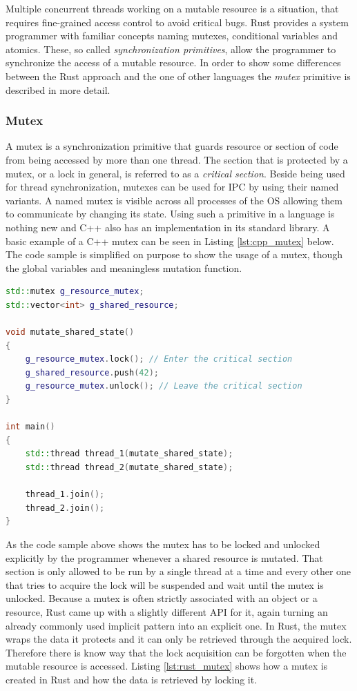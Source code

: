 Multiple concurrent threads working on a mutable resource is a situation, that requires fine-grained access control to avoid critical bugs. Rust provides a system programmer with familiar concepts naming mutexes, conditional variables and atomics. These, so called \textit{synchronization primitives}, allow the programmer to synchronize the access of a mutable resource. In order to show some differences between the Rust approach and the one of other languages the \textit{mutex} primitive is described in more detail.

\subsubsection{Mutex}

A mutex is a synchronization primitive that guards resource or section of code from being accessed by more than one thread. The section that is protected by a mutex, or a lock in general, is referred to as a \textit{critical section}. Beside being used for thread synchronization, mutexes can be used for \ac{IPC} by using their named variants. A named mutex is visible across all processes of the \ac{OS} allowing them to communicate by changing its state. Using such a primitive in a language is nothing new and C++ also has an implementation in its standard library. A basic example of a C++ mutex can be seen in Listing \ref{lst:cpp_mutex} below. The code sample is simplified on purpose to show the usage of a mutex, though the global variables and meaningless mutation function.\\

\begin{lstlisting}[caption={Usage of a std::mutex to guard a critical section in C++}, label={lst:cpp_mutex}, language=C++]
std::mutex g_resource_mutex;
std::vector<int> g_shared_resource;

void mutate_shared_state() 
{
	g_resource_mutex.lock(); // Enter the critical section
	g_shared_resource.push(42);
	g_resource_mutex.unlock(); // Leave the critical section
}

int main()
{
	std::thread thread_1(mutate_shared_state);
	std::thread thread_2(mutate_shared_state);
	
	thread_1.join();
	thread_2.join();
}
\end{lstlisting}

\noindent
As the code sample above shows the mutex has to be locked and unlocked explicitly by the programmer whenever a shared resource is mutated. That section is only allowed to be run by a single thread at a time and every other one that tries to acquire the lock will be suspended and wait until the mutex is unlocked. Because a mutex is often strictly associated with an object or a resource, Rust came up with a slightly different \ac{API} for it, again turning an already commonly used implicit pattern into an explicit one. In Rust, the mutex wraps the data it protects and it can only be retrieved through the acquired lock. Therefore there is know way that the lock acquisition can be forgotten when the mutable resource is accessed. Listing \ref{lst:rust_mutex} shows how a mutex is created in Rust and how the data is retrieved by locking it.\\

